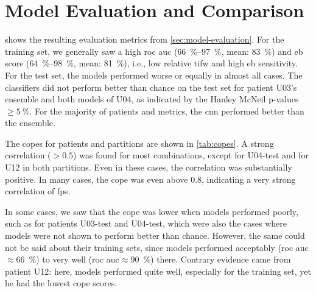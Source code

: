 \section{Model Evaluation and Comparison} \label{sec:model-eval-and-comparison}
 shows the resulting evaluation metrics from \cref{sec:model-evaluation}.
For the training set, we generally saw a high \gls{roc auc} (\SIrange{66}{97}{\percent}, mean: \SI{83}{\percent}) and \gls{eb} score (\SIrange{64}{98}{\percent}, mean: \SI{81}{\percent}), i.e., low relative \gls{tifw} and high \gls{eb} sensitivity.
For the test set, the models performed worse or equally in almost all cases.
The classifiers did not perform better than chance on the test set for patient U03's ensemble and both models of U04, as indicated by the Hanley McNeil p-values~$\geq\SI{5}{\percent}$.
For the majority of patients and metrics, the \gls{cnn} performed better than the ensemble.

The \glspl{cope} for patients and partitions are shown in \cref{tab:copes}.
A strong correlation ($>0.5$) was found for most combinations, except for U04-test and for U12 in both partitions.
Even in these cases, the correlation was substantially positive.
In many cases, the \gls{cope} was even above \num{0.8}, indicating a very strong correlation of \glspl{fp}.

\begin{table}[htbp]
    \centering
    \caption[Correlation of Prediction Errors]{\gls{cope} between each Patient's Models per Partition}
    \label{tab:copes}
    \setlength{\tabcolsep}{12pt}
    
\end{table}

In some cases, we saw that the \gls{cope} was lower when models performed poorly, such as for patients U03-test and U04-test, which were also the cases where models were not shown to perform better than chance.
However, the same could not be said about their training sets, since models performed acceptably (\gls{roc auc}$\approx$\SI{66}{\percent}) to very well (\gls{roc auc}$\approx$\SI{90}{\percent}) there.
Contrary evidence came from patient U12: here, models performed quite well, especially for the training set, yet he had the lowest \gls{cope} scores.

\begin{table}[htbp]
    \centering
    \caption[Model Evaluation]{\textbf{Model Evaluation Metrics per Patient and Model}\\Thresh.: the optimal threshold, EB sens.: event-based sensitivity, $p_{\mathrm{HM}}$: p-value of the Hanley McNeil test for ROC AUC. \\\textit{All values in percent and rounded}.}
    \label{tab:model_eval_metrics}
    \setlength{\tabcolsep}{4.5pt}
    \renewcommand{\arraystretch}{1.15}
    
\end{table}
